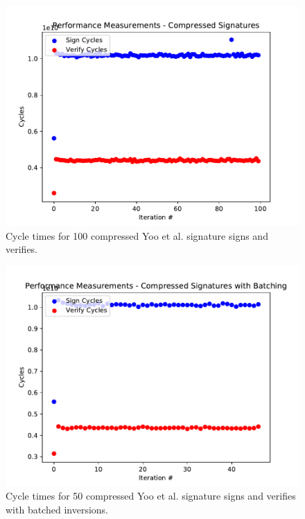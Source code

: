\begin{figure}
\includegraphics{compressed-cycles.pdf}
\caption{Cycle times for 100 compressed Yoo et al. signature signs and verifies.}
\label{fig:compressedcyclesgraph}
\end{figure}

\begin{figure}
\includegraphics{CB-cycles.pdf}
\caption{Cycle times for 50 compressed Yoo et al. signature signs and verifies with batched inversions.}
\label{fig:CBcyclesgraph}
\end{figure}